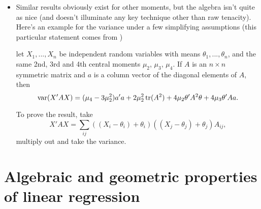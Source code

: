 \begin{itemize}[leftmargin=0pt]
\item Similar results obviously exist for other moments, but the
  algebra isn't quite as nice (and doesn't illuminate any key
  technique other than raw tenacity).  Here's an example for the
  variance under a few simplifying assumptions (this particular
  statement comes from \citealp{SL03})
  \begin{thm}
    let $X_1,...,X_n$ be independent random variables with means
    $\theta_1,...,\theta_n$, and the same 2nd, 3rd and 4th central
    moments $\mu_2$, $\mu_3$, $\mu_4$.  If $A$ is an $n \times n$
    symmetric matrix and $a$ is a column vector of the diagonal
    elements of $A$, then
    \begin{equation*}
      \operatorname{var}(X'AX) = 
      (\mu_4 - 3 \mu_2^2)a'a + 2 \mu_2^2 \operatorname{tr}(A^2) + 4 \mu_2 \theta'A^2 \theta + 4 \mu_3 \theta' A a.
    \end{equation*}
  \end{thm}
  To prove the result, take
  \begin{equation*}
    X'A X = \sum_{ij} ((X_i - \theta_i) + \theta_i) ((X_j - \theta_j) + \theta_j) A_{ij},
  \end{equation*}
  multiply out and take the variance.

\end{itemize}

\section{Algebraic and geometric properties of linear regression}

